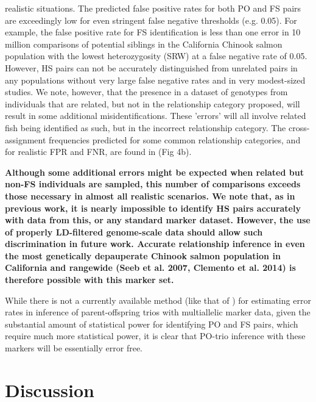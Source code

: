 realistic situations. The predicted false positive rates for both PO and FS pairs are
exceedingly low for even stringent false negative thresholds (e.g. 0.05).
For example, the false positive rate for FS identification is less than one error in 10 million
comparisons of potential siblings in the California Chinook salmon population with the lowest
heterozygosity (SRW) at a false negative rate of 0.05. However, HS pairs can not be accurately
distinguished from unrelated pairs in any populations without very large false negative rates
and in very modest-sized studies.
We note, however, that the presence in a dataset of genotypes from individuals that are related, but not in
 the relationship category proposed, will result in some additional misidentifications.
 These 'errors' will all involve related fish being identified as such, but in the incorrect relationship category.  The cross-assignment frequencies predicted for some common relationship categories, and for realistic FPR and FNR, are found in (Fig 4b).



\textbf{Although some additional errors might be
expected when related but non-FS individuals are sampled,  this number of comparisons exceeds
those necessary in almost all realistic scenarios.
We note that, as in previous work, it is nearly impossible to identify HS pairs accurately
with data from this, or any standard marker dataset. However, the use of properly LD-filtered
genome-scale data should allow such discrimination in future work.
Accurate relationship
inference in even the most genetically depauperate Chinook salmon population in California
and rangewide (Seeb et al. 2007, Clemento et al. 2014) is therefore possible with this marker set.}


While there is not a currently available method (like that of \citeauthor{anderson2006power}) for estimating error rates in
inference of parent-offspring trios with multiallelic marker data, given the substantial amount of statistical power for identifying PO and FS pairs, which require much more statistical power, it is clear that PO-trio inference with these markers will be essentially error free.



\section*{Discussion}

